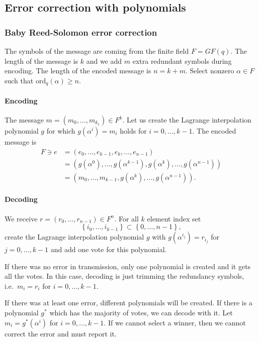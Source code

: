 \documentclass{article}
\begin{document}
\subsection{Error correction with polynomials}

\subsubsection{Baby Reed-Solomon error correction}

The symbols of the message are coming from the finite field $F=GF(q)$.
The length of the message is $k$ and we add $m$ extra redundant symbols during encoding.
The length of the encoded message is $n=k+m$.
Select nonzero $\alpha \in F$ such that $\mathrm{ord}_q(\alpha) \ge n$.

\paragraph{Encoding}
The message $m=(m_0,\ldots,m_{k_1}) \in F^k$.
Let us create the Lagrange interpolation polynomial $g$ for which $g(\alpha^i) = m_i$ holds for $i=0,\ldots,k-1$.
The encoded message is 
\begin{align*}
    F \ni e &= (e_0,\ldots,e_{k-1},e_k,\ldots,e_{n-1}) \\
            &= (g(\alpha^0),\ldots,g(\alpha^{k-1}),g(\alpha^{k}),\ldots,g(\alpha^{n-1})) \\
            &= (m_0,\ldots,m_{k-1},g(\alpha^{k}),\ldots,g(\alpha^{n-1})).
\end{align*}

\paragraph{Decoding}
We receive $r=(r_0,\ldots,r_{n-1}) \in F^n$. For all $k$ element index set
\[
    \left\{ i_0,\ldots,i_{k-1} \right\} \subset \left\{ 0,\ldots,n-1 \right\},
\]
create the Lagrange interpolation polynomial $g$ with $g(\alpha^{i_j})=r_{i_j}$ for $j=0,\ldots,k-1$ and add one vote for this polynomial.

If there was no error in transmission, only one polynomial is created and it gets all the votes.
In this case, decoding is just trimming the redundancy symbols, i.e.\ $m_i=r_i$ for $i=0,\ldots,k-1$.

If there was at least one error, different polynomials will be created.
If there is a polynomial $g^*$ which has the majority of votes, we can decode with it.
Let $m_i = g^*(\alpha^i)$ for $i=0,\ldots,k-1$.
If we cannot select a winner, then we cannot correct the error and must report it.
\end{document}
